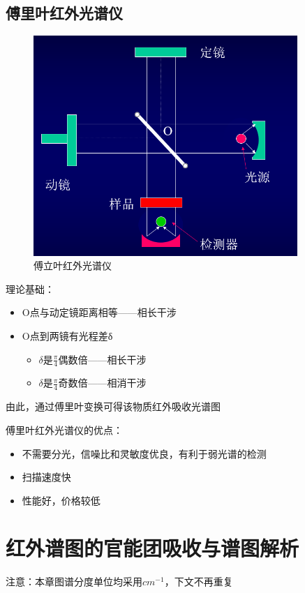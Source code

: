 \subsection{傅里叶红外光谱仪}
\begin{figure}[ht]
    \centering
    \includegraphics[width=10cm]{image/chp5_fur_ins.png}
    \caption{傅立叶红外光谱仪}
    \label{fig:fur_ins}
\end{figure}
理论基础：
\begin{itemize}
    \item O点与动定镜距离相等——相长干涉
    \item O点到两镜有光程差δ
    \begin{itemize}
        \item $\delta$是$\frac{\pi}{4}$偶数倍——相长干涉
        \item $\delta$是$\frac{\pi}{4}$奇数倍——相消干涉
    \end{itemize}
\end{itemize}

由此，通过傅里叶变换可得该物质红外吸收光谱图
\begin{note}
    傅里叶红外光谱仪的优点：
    \begin{itemize}
        \item 不需要分光，信噪比和灵敏度优良，有利于弱光谱的检测
        \item 扫描速度快
        \item 性能好，价格较低
    \end{itemize}
\end{note}

\section{红外谱图的官能团吸收与谱图解析}
注意：本章图谱分度单位均采用$cm^{-1}$，下文不再重复

